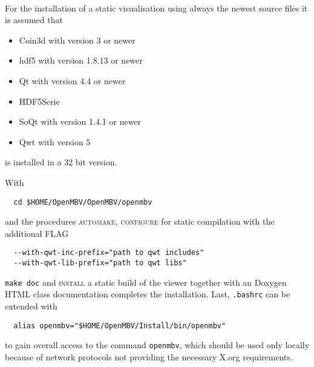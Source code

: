 \paragraph{\OpenMBV{}}
For the installation of a static visualisation using always the newest source files it is assumed that
\begin{itemize}
\item Coin3d with version 3 or newer 
\item hdf5 with version 1.8.13 or newer 
\item Qt with version 4.4 or newer 
\item HDF5Serie 
\item SoQt with version 1.4.1 or newer 
\item Qwt with version 5
\end{itemize}
is installed in a 32 bit version.\par
With
\begin{verbatim}
  cd $HOME/OpenMBV/OpenMBV/openmbv
\end{verbatim} 
and the procedures \textsc{automake, configure} for static compilation with the additional FLAG
\begin{verbatim}
  --with-qwt-inc-prefix="path to qwt includes"
  --with-qwt-lib-prefix="path to qwt libs"
\end{verbatim}
\texttt{make doc} and \textsc{install} a static build of the viewer together with an Doxygen HTML class documentation completes the installation. Last, \texttt{.bashrc} can be extended with
\begin{verbatim}
  alias openmbv="$HOME/OpenMBV/Install/bin/openmbv"
\end{verbatim}
to gain overall access to the command \texttt{openmbv}, which should be used only locally because of network protocols not providing the necessary X.org requirements.

